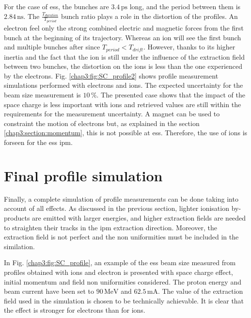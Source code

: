 \begin{refsection}
  
  For the case of \acrshort{ess}, the bunches are $3.4\,\mathrm{ps}$ long, and the period between them is $2.84\,\mathrm{ns}$. The $\frac{T_{duration}}{T_{period}}$ bunch ratio plays a role in the distortion of the profiles. An electron feel only the strong combined electric and magnetic forces from the first bunch at the beginning of its trajectory. Whereas an ion will see the first bunch and multiple bunches after since $T_{period} < T_{drift}$. However, thanks to its higher inertia and the fact that the ion is still under the influence of the extraction field between two bunches, the distortion on the ions is less than the one experienced by the electrons.
  Fig. \ref{chap3:fig:SC_profile2} shows profile measurement simulations performed with electrons and ions. The expected uncertainty for the beam size measurement is $10\,\mathrm{\%}$. The presented case shows that the impact of the space charge is less important with ions and retrieved values are still within the requirements for the measurement uncertainty.
  A magnet can be used to constraint the motion of electrons but, as explained in the section \ref{chap3:section:momentum}, this is not possible at \acrshort{ess}. Therefore, the use of ions is forseen for the \acrshort{ess} \acrshort{ipm}.


  \section{Final profile simulation}
  Finally, a complete simulation of profile measurements can be done taking into account of all effects.
  As discussed in the previous section, lighter ionisation by-products are emitted with larger energies, and higher extraction fields are needed to straighten their tracks in the \acrshort{ipm} extraction direction.
  Moreover, the extraction field is not perfect and the non uniformities must be included in the similation.

  In Fig. \ref{chap3:fig:SC_profile}, an example of the \acrshort{ess} beam size measured from profiles obtained with ions and electron is presented with space charge effect, initial momentum and field non uniformities considered. The proton energy and beam current have been set to $90\,\mathrm{MeV}$ and $62.5\,\mathrm{mA}$. The value of the extraction field used in the simulation is chosen to be technically achievable. It is clear that the effect is stronger for electrons than for ions.
  


\end{refsection}
